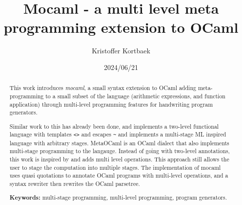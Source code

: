 \documentclass[a4paper, 12pt]{article}
\title{Mocaml - a multi level meta programming extension to OCaml}
\author{Kristoffer Kortbaek}
\date{2024/06/21}
\begin{document}
\maketitle

\begin{abstract}
This work introduces \textit{mocaml}, a small syntax extension to OCaml adding meta-programming to a small subset of the language (arithmetic expressions, and function application) through multi-level programming features for handwriting program generators.

Similar work to this has already been done, and \cite{two-stage} implements a two-level functional language with templates \texttt{<>} and escapes \texttt{\~} and \cite{metaML} implements a multi-stage ML inspired language with arbitrary stages. MetaOCaml is an OCaml dialect that also implements multi-stage programming to the langauge. Instead of going with two-level annotations, this work is inspired by \cite{multilevel} and adds multi level operations. This approach still allows the user to stage the computation into multiple stages.
The implementation of mocaml uses quasi quotations to annotate OCaml programs with multi-level operations, and a syntax rewriter then rewrites the OCaml parsetree.

\textbf{Keywords:} multi-stage programming, multi-level programming, program generators.
\end{abstract}

\tableofcontents







\end{document}
